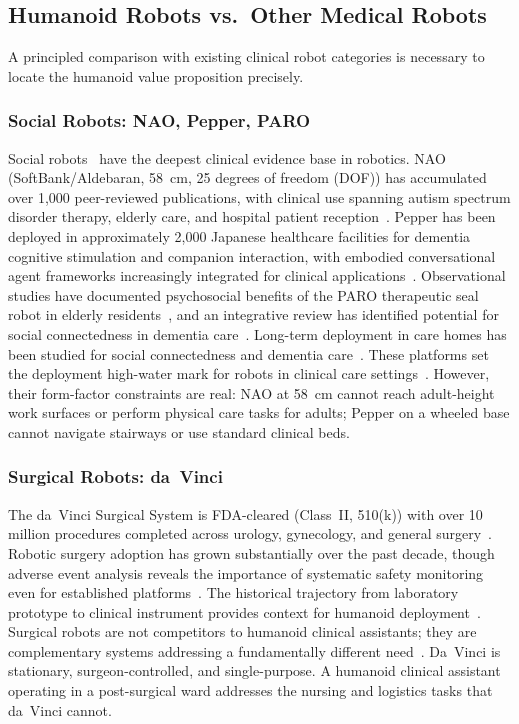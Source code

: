 \documentclass[acmjour]{acmart}
\begin{document}
\subsection{Humanoid Robots vs.\ Other Medical Robots}
\label{sec:alternatives}

A principled comparison with existing clinical robot categories is necessary to
locate the humanoid value proposition precisely.

\subsubsection{Social Robots: NAO, Pepper, PARO}

Social robots~\cite{fong2003survey,dautenhahn2007socially} have the deepest
clinical evidence base in robotics. NAO
(SoftBank/Aldebaran, 58~cm, 25 degrees of freedom (DOF)) has accumulated over
1,000 peer-reviewed
publications, with clinical use spanning autism spectrum disorder therapy,
elderly care, and hospital patient reception~\cite{cabibihan2013robots}. Pepper
has been deployed in approximately 2,000 Japanese healthcare facilities for
dementia cognitive stimulation and companion interaction, with embodied
conversational agent frameworks increasingly integrated for clinical
applications~\cite{provoost2017embodied,sorensen2025humanoid,cunha2025humanoid}.
Observational studies have documented psychosocial benefits of the PARO therapeutic
seal robot in elderly residents~\cite{wada2007living}, and an integrative review
has identified potential for social connectedness in dementia
care~\cite{moyle2017telepresence}. Long-term deployment in care homes has been
studied for social connectedness and dementia care~\cite{moyle2014dementia}.
These platforms set the deployment high-water mark for robots in clinical care
settings~\cite{abdi2018scoping}. However, their form-factor constraints are real: NAO at 58~cm cannot
reach adult-height work surfaces or perform physical care tasks for adults; Pepper
on a wheeled base cannot navigate stairways or use standard clinical beds.

\subsubsection{Surgical Robots: da~Vinci}

The da~Vinci Surgical System is FDA-cleared (Class~II, 510(k)) with over 10
million procedures completed across urology, gynecology, and general
surgery~\cite{lanfranco2004robotic,sheetz2020robotic}. Robotic surgery adoption
has grown substantially over the past decade, though adverse event analysis
reveals the importance of systematic safety monitoring even for established
platforms~\cite{alemzadeh2016adverse}. The historical trajectory from laboratory
prototype to clinical instrument provides context for humanoid
deployment~\cite{camarillo2004robotic}. Surgical robots are not competitors to
humanoid clinical assistants; they are complementary systems addressing a
fundamentally different need~\cite{morgan2022robots}. Da~Vinci is stationary, surgeon-controlled, and single-purpose.
A humanoid clinical assistant operating in a post-surgical ward addresses the
nursing and logistics tasks that da~Vinci cannot.
\end{document}
